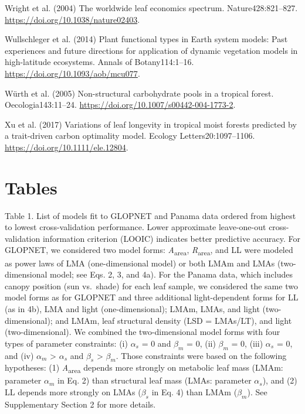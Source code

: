 \documentclass[
  12pt,
  letterpaper,
  DIV=11,
  numbers=noendperiod]{scrartcl}
\newlength{\cslhangindent}
\newenvironment{CSLReferences}[2] %
 {\begin{list}{}{%
  \setlength{\itemindent}{0pt}
  \setlength{\leftmargin}{0pt}
  \setlength{\parsep}{0pt}
  \ifodd #1
   \setlength{\leftmargin}{\cslhangindent}
   \setlength{\itemindent}{-1\cslhangindent}
  \fi
  \setlength{\itemsep}{#2\baselineskip}}}
 {\end{list}}
\begin{document}
\begin{CSLReferences}{1}{1}
Wright et al. (2004) The worldwide leaf economics spectrum.
Nature428:821--827. \url{https://doi.org/10.1038/nature02403}.

Wullschleger et al. (2014) Plant functional types in {Earth} system
models: {Past} experiences and future directions for application of
dynamic vegetation models in high-latitude ecosystems. Annals of
Botany114:1--16. \url{https://doi.org/10.1093/aob/mcu077}.

Würth et al. (2005) Non-structural carbohydrate pools in a tropical
forest. Oecologia143:11--24.
\url{https://doi.org/10.1007/s00442-004-1773-2}.

Xu et al. (2017) Variations of leaf longevity in tropical moist forests
predicted by a trait-driven carbon optimality model. Ecology
Letters20:1097--1106. \url{https://doi.org/10.1111/ele.12804}.

\end{CSLReferences}

\newpage

\section{Tables}\label{tables}

Table 1. List of models fit to GLOPNET and Panama data ordered from
highest to lowest cross-validation performance. Lower approximate
leave-one-out cross-validation information criterion (LOOIC) indicates
better predictive accuracy. For GLOPNET, we considered two model forms:
\emph{A}\textsubscript{area}, \emph{R}\textsubscript{area}, and LL were
modeled as power laws of LMA (one-dimensional model) or both LMAm and
LMAs (two-dimensional model; see Eqs. 2, 3, and 4a). For the Panama
data, which includes canopy position (sun vs.~shade) for each leaf
sample, we considered the same two model forms as for GLOPNET and three
additional light-dependent forms for LL (as in 4b), LMA and light
(one-dimensional); LMAm, LMAs, and light (two-dimensional); and LMAm,
leaf structural density (LSD = LMAs/LT), and light (two-dimensional). We
combined the two-dimensional model forms with four types of parameter
constraints: (i) \(\alpha_s\) = 0 and \(\beta_m\) = 0, (ii) \(\beta_m\)
= 0, (iii) \(\alpha_s\) = 0, and (iv) \(\alpha_m\) \textgreater{}
\(\alpha_s\) and \(\beta_s\) \textgreater{} \(\beta_m\). Those
constraints were based on the following hypotheses: (1)
\emph{A}\textsubscript{area} depends more strongly on metabolic leaf
mass (LMAm: parameter \(\alpha_m\) in Eq. 2) than structural leaf mass
(LMAs: parameter \(\alpha_s\)), and (2) LL depends more strongly on LMAs
(\(\beta_s\) in Eq. 4) than LMAm (\(\beta_m\)). See Supplementary
Section 2 for more details.
\end{document}
